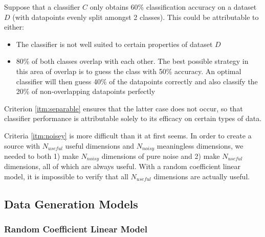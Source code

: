 \documentclass{article}
\begin{document}
Suppose that a classifier $C$ only obtains 60\% classification accuracy on a
dataset $D$ (with datapoints evenly split amongst 2 classes). This could be
attributable to either:
\begin{itemize}
    \item The classifier is not well suited to certain properties of dataset $D$
    \item 80\% of both classes overlap with each other. The best possible
        strategy in this area of overlap is to guess the class with 50\%
        accuracy. An optimal classifier will then guess 40\% of the datapoints
        correctly and also classify the 20\% of non-overlapping datapoints
        perfectly
\end{itemize}
Criterion \ref{itm:separable} ensures that the latter case does not occur,
so that classifier performance is attributable solely to its efficacy on
certain types of data.

Criteria \ref{itm:noisey} is more difficult than it at first seems. In
order to create a source with $N_{useful}$ useful dimensions and $N_{noisy}$
meaningless dimensions, we needed to both 1) make $N_{noisy}$ dimensions of
pure noise and 2) make $N_{useful}$ dimensions, all of which are always useful.
With a random coefficient linear model, it is impossible to verify that all
$N_{useful}$ dimensions are actually useful.



\subsection{Data Generation Models}

\subsubsection{Random Coefficient Linear Model}
\end{document}
